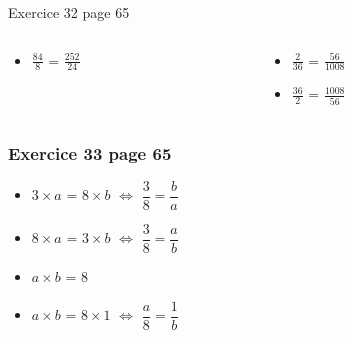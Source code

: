 \documentclass[xcolor={dvipsnames}]{beamer}
\begin{document}
\begin{frame}
\begin{block}{Exercice 32 page 65}
\begin{columns}
\begin{column}{0.25\textwidth}
\begin{LARGE}
\begin{itemize}
						\item $\frac{84}{8}$ = $\frac{252}{24}$\pause			
					\end{itemize}	
				\end{LARGE}
				
			\end{column}
			
			\begin{column}{0.25\textwidth}
				\begin{LARGE}
					\begin{itemize}
						\item $\frac{2}{36}$ = $\frac{56}{1008}$					
						
						\item $\frac{36}{2}$ = $\frac{1008}{56}$
					\end{itemize}	
				\end{LARGE}
				
			\end{column}
		\end{columns}
	\end{block}
	
\end{frame}

\begin{frame}
	\frametitle{Exercice 33 page 65}
	
	\begin{LARGE}
		\begin{itemize}
			\setlength\itemsep{1em}
			\item $3 \times a$ = $8 \times b$ $\Leftrightarrow$ $\dfrac{3}{8} = \dfrac{b}{a}$    \pause
			
			\item $8 \times a$ = $3 \times b$ $\Leftrightarrow$ $\dfrac{3}{8} = \dfrac{a}{b}$     \pause
			
			\item<3> $a \times b$ = $8$  \pause
			
			\item<4> $a \times b$ = $8 \times 1$ $\Leftrightarrow$ $\dfrac{a}{8} = \dfrac{1}{b}$     \pause
		\end{itemize}
	\end{LARGE}
	
\end{frame}
\end{document}
